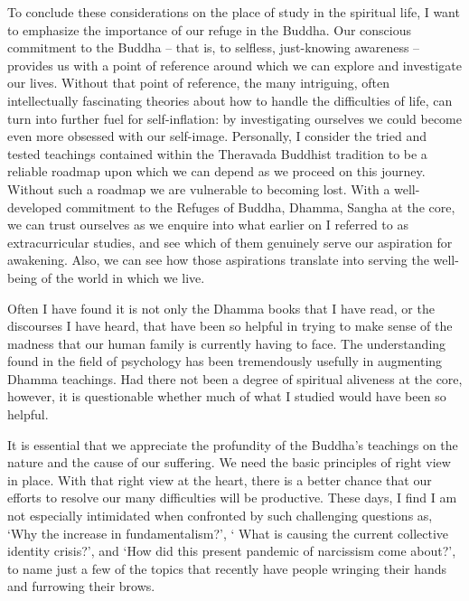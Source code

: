 To conclude these considerations on the place of study in the spiritual
life, I want to emphasize the importance of our refuge in the Buddha.
Our conscious commitment to the Buddha -- that is, to selfless,
just-knowing awareness -- provides us with a point of reference around
which we can explore and investigate our lives. Without that point of
reference, the many intriguing, often intellectually fascinating
theories about how to handle the difficulties of life, can turn into
further fuel for self-inflation: by investigating ourselves we could
become even more obsessed with our self-image. Personally, I consider
the tried and tested teachings contained within the Theravada Buddhist
tradition to be a reliable roadmap upon which we can depend as we
proceed on this journey. Without such a roadmap we are vulnerable to
becoming lost. With a well-developed commitment to the Refuges of
Buddha, Dhamma, Sangha at the core, we can trust ourselves as we enquire
into what earlier on I referred to as extracurricular studies, and see
which of them genuinely serve our aspiration for awakening. Also, we can
see how those aspirations translate into serving the well-being of the
world in which we live.

Often I have found it is not only the Dhamma books that I have read, or
the discourses I have heard, that have been so helpful in trying to make
sense of the madness that our human family is currently having to face.
The understanding found in the field of psychology has been tremendously
usefully in augmenting Dhamma teachings. Had there not been a degree of
spiritual aliveness at the core, however, it is questionable whether
much of what I studied would have been so helpful.

It is essential that we appreciate the profundity of the Buddha's
teachings on the nature and the cause of our suffering. We need the
basic principles of right view in place. With that right view at the
heart, there is a better chance that our efforts to resolve our many
difficulties will be productive. These days, I find I am not especially
intimidated when confronted by such challenging questions as, `Why the
increase in fundamentalism?', ` What is causing the current collective
identity crisis?', and `How did this present pandemic of narcissism come
about?', to name just a few of the topics that recently have people
wringing their hands and furrowing their brows.

